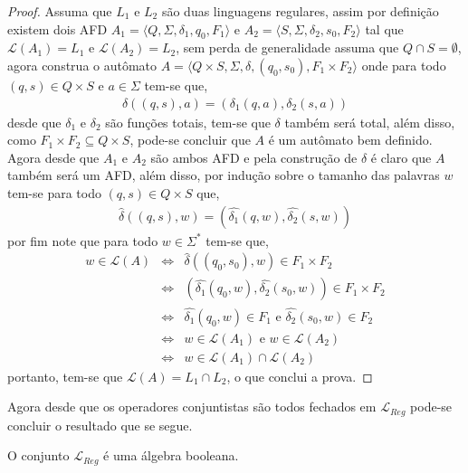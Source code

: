 \begin{proof}
	Assuma que $L_1$ e $L_2$ são duas linguagens regulares, assim por definição existem dois AFD $A_1 = \langle Q, \Sigma, \delta_1, q_0, F_1 \rangle$ e $A_2 = \langle S, \Sigma, \delta_2, s_0, F_2 \rangle$ tal que $\mathcal{L}(A_1) = L_1$ e $\mathcal{L}(A_2) = L_2$, sem perda de generalidade assuma que $Q \cap S = \emptyset$, agora construa o autômato $A = \langle Q \times S, \Sigma, \delta, (q_0, s_0), F_1 \times F_2\rangle$ onde para todo $(q, s) \in Q \times S$ e $a \in \Sigma$ tem-se que, 
	\begin{eqnarray*}
		\delta((q, s), a) = (\delta_1(q, a), \delta_2(s, a))
	\end{eqnarray*}
	desde que $\delta_1$ e $\delta_2$ são funções totais, tem-se que $\delta$ também será total, além disso, como $F_1 \times F_2 \subseteq Q \times S$, pode-se concluir que $A$ é um autômato bem definido. Agora desde que $A_1$ e $A_2$ são ambos AFD e pela construção de $\delta$ é claro que $A$ também será um AFD, além disso, por indução sobre o tamanho das palavras $w$ tem-se para todo $(q, s) \in Q \times S$ que, 
	\begin{eqnarray*}
		\widehat{\delta}((q, s), w) = (\widehat{\delta_1}(q, w), \widehat{\delta_2}(s, w))
	\end{eqnarray*}
	por fim note que para todo $w \in \Sigma^*$ tem-se que,
	\begin{eqnarray*}
		w \in \mathcal{L}(A) & \Longleftrightarrow & \widehat{\delta}((q_0, s_0), w) \in F_1 \times F_2\\
		& \Longleftrightarrow & (\widehat{\delta_1}(q_0, w), \widehat{\delta_2}(s_0, w)) \in F_1 \times F_2\\
		& \Longleftrightarrow & \widehat{\delta_1}(q_0, w) \in F_1 \text{ e } \widehat{\delta_2}(s_0, w) \in F_2\\
		& \Longleftrightarrow & w \in \mathcal{L}(A_1) \text{ e } w \in \mathcal{L}(A_2)\\
		& \Longleftrightarrow & w \in \mathcal{L}(A_1) \cap \mathcal{L}(A_2)
	\end{eqnarray*}
	portanto, tem-se que $\mathcal{L}(A) = L_1 \cap L_2$, o que conclui a prova.
\end{proof}

Agora desde que os operadores conjuntistas são todos fechados em $\mathcal{L}_{Reg}$ pode-se concluir o resultado que se segue.

\begin{corollary}
	O conjunto $\mathcal{L}_{Reg}$ é uma álgebra booleana.
\end{corollary}


